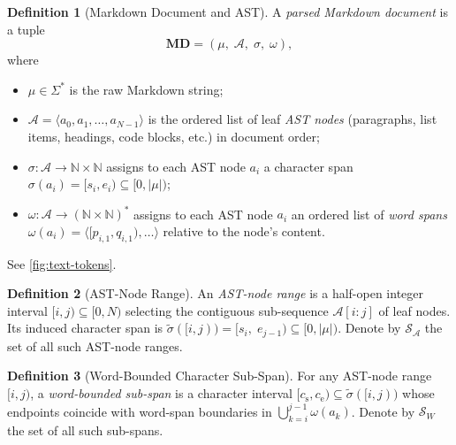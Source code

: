 \documentclass{article}
\theoremstyle{definition}
\newtheorem{definition}{Definition}[section]
\newcommand{\MD}{\mathbf{MD}}
\newcommand{\Spans}{\mathcal{S}}
\begin{document}
\begin{definition}[Markdown Document and AST]
      A \emph{parsed Markdown document} is a tuple
      \[
            \MD = (\mu,\; \mathcal{A},\; \sigma,\; \omega),
      \]
      where
      \begin{itemize}
            \item $\mu \in \Sigma^{*}$ is the raw Markdown string;
            \item $\mathcal{A} = \langle a_0, a_1, \ldots, a_{N-1}\rangle$ is the
                  ordered list of leaf \emph{AST nodes} (paragraphs, list items,
                  headings, code blocks, etc.) in document order;
            \item $\sigma : \mathcal{A} \to \mathbb{N} \times \mathbb{N}$ assigns to
                  each AST node $a_i$ a character span
                  $\sigma(a_i) = [s_i, e_i) \subseteq [0, |\mu|)$;
            \item $\omega : \mathcal{A} \to (\mathbb{N}\times\mathbb{N})^{*}$
                  assigns to each AST node $a_i$ an ordered list of
                  \emph{word spans} $\omega(a_i) = \langle[p_{i,1}, q_{i,1}), \ldots\rangle$
                  relative to the node's content.
      \end{itemize}
      See \cref{fig:text-tokens}.
\end{definition}

\begin{definition}[AST-Node Range]
      An \emph{AST-node range} is a half-open integer interval
      $[i, j) \subseteq [0, N)$ selecting the contiguous sub-sequence
      $\mathcal{A}[i{:}j]$ of leaf nodes.  Its induced character span is
      $\widetilde{\sigma}([i,j)) = [s_i,\; e_{j-1}) \subseteq [0, |\mu|)$.
      Denote by $\Spans_{\mathcal{A}}$ the set of all such AST-node ranges.
\end{definition}

\begin{definition}[Word-Bounded Character Sub-Span]
      For any AST-node range $[i,j)$, a \emph{word-bounded sub-span} is a
      character interval $[c_{\text{s}}, c_{\text{e}}) \subseteq
            \widetilde{\sigma}([i,j))$ whose endpoints coincide with word-span
      boundaries in $\bigcup_{k = i}^{j-1}\omega(a_k)$.  Denote by
      $\Spans_{W}$ the set of all such sub-spans.
\end{definition}
\end{document}
